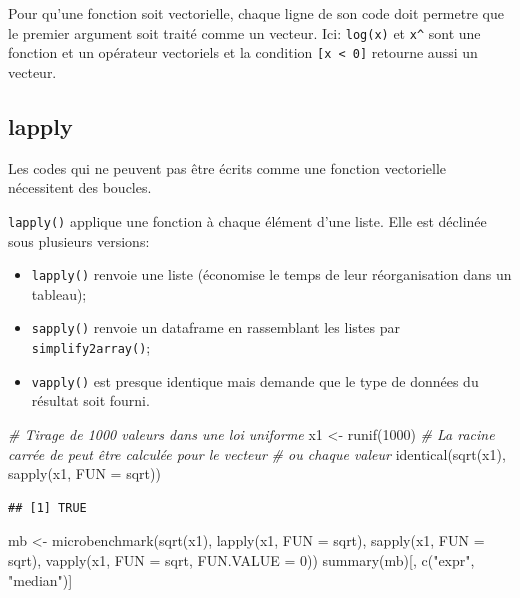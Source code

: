 \documentclass[
  11pt,
  french,
  a4paper,
  extrafontsizes,onecolumn,openright
  ]{memoir}
\newenvironment{Shaded}{\begin{snugshade}}{\end{snugshade}}
\newcommand{\AttributeTok}[1]{\textcolor[rgb]{0.77,0.63,0.00}{#1}}
\newcommand{\CommentTok}[1]{\textcolor[rgb]{0.56,0.35,0.01}{\textit{#1}}}
\newcommand{\DecValTok}[1]{\textcolor[rgb]{0.00,0.00,0.81}{#1}}
\newcommand{\FunctionTok}[1]{\textcolor[rgb]{0.00,0.00,0.00}{#1}}
\newcommand{\NormalTok}[1]{#1}
\newcommand{\OtherTok}[1]{\textcolor[rgb]{0.56,0.35,0.01}{#1}}
\newcommand{\StringTok}[1]{\textcolor[rgb]{0.31,0.60,0.02}{#1}}
\providecommand{\tightlist}{%
  \setlength{\itemsep}{0pt}\setlength{\parskip}{0pt}}
\begin{document}
\normalsize

Pour qu'une fonction soit vectorielle, chaque ligne de son code doit permetre que le premier argument soit traité comme un vecteur.
Ici: \texttt{log(x)} et \texttt{x\^{}} sont une fonction et un opérateur vectoriels et la condition \texttt{{[}x\ \textless{}\ 0{]}} retourne aussi un vecteur.

\hypertarget{lapply}{%
\subsection{lapply}\label{lapply}}

Les codes qui ne peuvent pas être écrits comme une fonction vectorielle nécessitent des boucles.

\texttt{lapply()} applique une fonction à chaque élément d'une liste.
Elle est déclinée sous plusieurs versions:

\begin{itemize}
\tightlist
\item
  \texttt{lapply()} renvoie une liste (économise le temps de leur réorganisation dans un tableau);
\item
  \texttt{sapply()} renvoie un dataframe en rassemblant les listes par \texttt{simplify2array()};
\item
  \texttt{vapply()} est presque identique mais demande que le type de données du résultat soit fourni.
\end{itemize}

\scriptsize

\begin{Shaded}
\begin{Highlighting}[]
\CommentTok{\# Tirage de 1000 valeurs dans une loi uniforme}
\NormalTok{x1 }\OtherTok{\textless{}{-}} \FunctionTok{runif}\NormalTok{(}\DecValTok{1000}\NormalTok{)}
\CommentTok{\# La racine carrée de peut être calculée pour le vecteur}
\CommentTok{\# ou chaque valeur}
\FunctionTok{identical}\NormalTok{(}\FunctionTok{sqrt}\NormalTok{(x1), }\FunctionTok{sapply}\NormalTok{(x1, }\AttributeTok{FUN =}\NormalTok{ sqrt))}
\end{Highlighting}
\end{Shaded}

\begin{verbatim}
## [1] TRUE
\end{verbatim}

\begin{Shaded}
\begin{Highlighting}[]
\NormalTok{mb }\OtherTok{\textless{}{-}} \FunctionTok{microbenchmark}\NormalTok{(}\FunctionTok{sqrt}\NormalTok{(x1), }\FunctionTok{lapply}\NormalTok{(x1, }\AttributeTok{FUN =}\NormalTok{ sqrt), }\FunctionTok{sapply}\NormalTok{(x1, }
    \AttributeTok{FUN =}\NormalTok{ sqrt), }\FunctionTok{vapply}\NormalTok{(x1, }\AttributeTok{FUN =}\NormalTok{ sqrt, }\AttributeTok{FUN.VALUE =} \DecValTok{0}\NormalTok{))}
\FunctionTok{summary}\NormalTok{(mb)[, }\FunctionTok{c}\NormalTok{(}\StringTok{"expr"}\NormalTok{, }\StringTok{"median"}\NormalTok{)]}
\end{Highlighting}
\end{Shaded}
\end{document}
